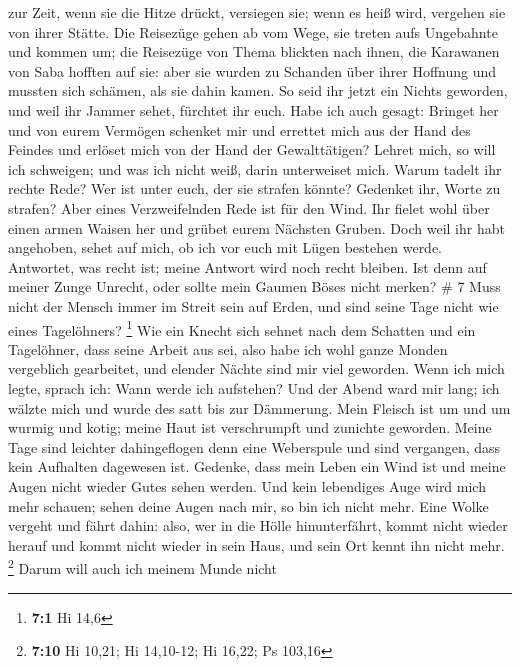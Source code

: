 zur Zeit, wenn sie die Hitze drückt, versiegen sie; wenn
es heiß wird, vergehen sie von ihrer Stätte.  Die Reisezüge
gehen ab vom Wege, sie treten aufs Ungebahnte und kommen um;
 die Reisezüge von Thema blickten nach ihnen, die Karawanen
von Saba hofften auf sie:  aber sie wurden zu Schanden über
ihrer Hoffnung und mussten sich schämen, als sie dahin kamen.
 So seid ihr jetzt ein Nichts geworden, und weil ihr Jammer
sehet, fürchtet ihr euch.  Habe ich auch gesagt: Bringet
her und von eurem Vermögen schenket mir  und errettet mich
aus der Hand des Feindes und erlöset mich von der Hand der
Gewalttätigen?  Lehret mich, so will ich schweigen; und was
ich nicht weiß, darin unterweiset mich.  Warum tadelt ihr
rechte Rede? Wer ist unter euch, der sie strafen könnte? 
Gedenket ihr, Worte zu strafen? Aber eines Verzweifelnden Rede ist für
den Wind.  Ihr fielet wohl über einen armen Waisen her und
grübet eurem Nächsten Gruben.  Doch weil ihr habt
angehoben, sehet auf mich, ob ich vor euch mit Lügen bestehen werde.
 Antwortet, was recht ist; meine Antwort wird noch recht
bleiben.  Ist denn auf meiner Zunge Unrecht, oder sollte
mein Gaumen Böses nicht merken? \# 7  Muss nicht der Mensch
immer im Streit sein auf Erden, und sind seine Tage nicht wie eines
Tagelöhners? \footnote{\textbf{7:1} Hi 14,6}  Wie ein Knecht
sich sehnet nach dem Schatten und ein Tagelöhner, dass seine Arbeit aus
sei,  also habe ich wohl ganze Monden vergeblich gearbeitet,
und elender Nächte sind mir viel geworden.  Wenn ich mich
legte, sprach ich: Wann werde ich aufstehen? Und der Abend ward mir
lang; ich wälzte mich und wurde des satt bis zur Dämmerung. 
Mein Fleisch ist um und um wurmig und kotig; meine Haut ist verschrumpft
und zunichte geworden.  Meine Tage sind leichter
dahingeflogen denn eine Weberspule und sind vergangen, dass kein
Aufhalten dagewesen ist.  Gedenke, dass mein Leben ein Wind
ist und meine Augen nicht wieder Gutes sehen werden.  Und
kein lebendiges Auge wird mich mehr schauen; sehen deine Augen nach mir,
so bin ich nicht mehr.  Eine Wolke vergeht und fährt dahin:
also, wer in die Hölle hinunterfährt, kommt nicht wieder herauf
 und kommt nicht wieder in sein Haus, und sein Ort kennt
ihn nicht mehr. \footnote{\textbf{7:10} Hi 10,21; Hi 14,10-12; Hi 16,22;
  Ps 103,16}  Darum will auch ich meinem Munde nicht
